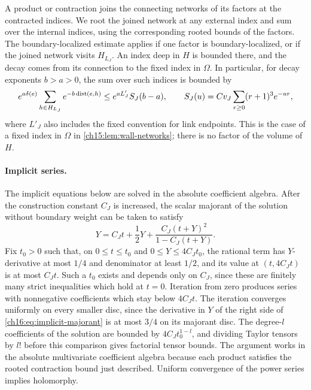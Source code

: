 A product or contraction joins the connecting networks of its factors at the contracted indices. We root the joined network at any external index and sum over the internal indices, using the corresponding rooted bounds of the factors. The boundary-localized estimate applies if one factor is boundary-localized, or if the joined network visits $H_{L_J}$. An index deep in $H$ is bounded there, and the decay comes from its connection to the fixed index in $\Omega$. In particular, for decay exponents $b>a>0$, the sum over such indices is bounded by
\begin{equation}\label{ch16:eq:hole-sum}
 e^{a\delta(e)}\sum_{h\in H_{L_J}}e^{-b\operatorname{dist}(e,h)}
       \le e^{aL'_J}S_J(b-a),\qquad
 S_J(u)=C v_J\sum_{r\ge0}(r+1)^3e^{-ur},
\end{equation}
where $L'_J$ also includes the fixed convention for link endpoints. This is the case of a fixed index in $\Omega$ in \cref{ch15:lem:wall-networks}; there is no factor of the volume of $H$.

\paragraph{Implicit series.}
The implicit equations below are solved in the absolute coefficient algebra. After the construction constant $C_J$ is increased, the scalar majorant of the solution without boundary weight can be taken to satisfy
\begin{equation}\label{ch16:eq:implicit-majorant}
 Y=C_Jt+\frac12Y+
             \frac{C_J(t+Y)^2}{1-C_J(t+Y)}.
\end{equation}
Fix $t_0>0$ such that, on $0\le t\le t_0$ and $0\le Y\le4C_Jt_0$, the rational term has $Y$-derivative at most $1/4$ and denominator at least $1/2$, and its value at $(t,4C_Jt)$ is at most $C_Jt$. Such a $t_0$ exists and depends only on $C_J$, since these are finitely many strict inequalities which hold at $t=0$. Iteration from zero produces series with nonnegative coefficients which stay below $4C_Jt$. The iteration converges uniformly on every smaller disc, since the derivative in $Y$ of the right side of \eqref{ch16:eq:implicit-majorant} is at most $3/4$ on its majorant disc. The degree-$l$ coefficients of the solution are bounded by $4C_Jt_0^{1-l}$, and dividing Taylor tensors by $l!$ before this comparison gives factorial tensor bounds. The argument works in the absolute multivariate coefficient algebra because each product satisfies the rooted contraction bound just described. Uniform convergence of the power series implies holomorphy.

